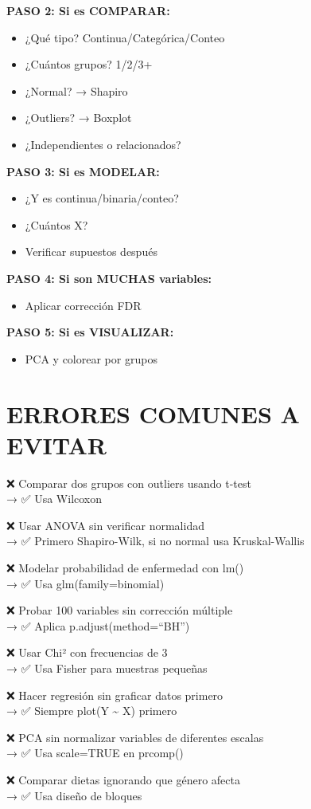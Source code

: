 \documentclass[
  10pt,
]{article}
\providecommand{\tightlist}{%
  \setlength{\itemsep}{0pt}\setlength{\parskip}{0pt}}
\begin{document}
\textbf{PASO 2: Si es COMPARAR:}

\begin{itemize}
\tightlist
\item[$\square$]
  ¿Qué tipo? Continua/Categórica/Conteo
\item[$\square$]
  ¿Cuántos grupos? 1/2/3+
\item[$\square$]
  ¿Normal? → Shapiro
\item[$\square$]
  ¿Outliers? → Boxplot
\item[$\square$]
  ¿Independientes o relacionados?
\end{itemize}

\textbf{PASO 3: Si es MODELAR:}

\begin{itemize}
\tightlist
\item[$\square$]
  ¿Y es continua/binaria/conteo?
\item[$\square$]
  ¿Cuántos X?
\item[$\square$]
  Verificar supuestos después
\end{itemize}

\textbf{PASO 4: Si son MUCHAS variables:}

\begin{itemize}
\tightlist
\item[$\square$]
  Aplicar corrección FDR
\end{itemize}

\textbf{PASO 5: Si es VISUALIZAR:}

\begin{itemize}
\tightlist
\item[$\square$]
  PCA y colorear por grupos
\end{itemize}

\section{ERRORES COMUNES A EVITAR}\label{errores-comunes-a-evitar}

❌ Comparar dos grupos con outliers usando t-test\\
→ ✅ Usa Wilcoxon

❌ Usar ANOVA sin verificar normalidad\\
→ ✅ Primero Shapiro-Wilk, si no normal usa Kruskal-Wallis

❌ Modelar probabilidad de enfermedad con lm()\\
→ ✅ Usa glm(family=binomial)

❌ Probar 100 variables sin corrección múltiple\\
→ ✅ Aplica p.adjust(method=``BH'')

❌ Usar Chi² con frecuencias de 3\\
→ ✅ Usa Fisher para muestras pequeñas

❌ Hacer regresión sin graficar datos primero\\
→ ✅ Siempre plot(Y \textasciitilde{} X) primero

❌ PCA sin normalizar variables de diferentes escalas\\
→ ✅ Usa scale=TRUE en prcomp()

❌ Comparar dietas ignorando que género afecta\\
→ ✅ Usa diseño de bloques
\end{document}
